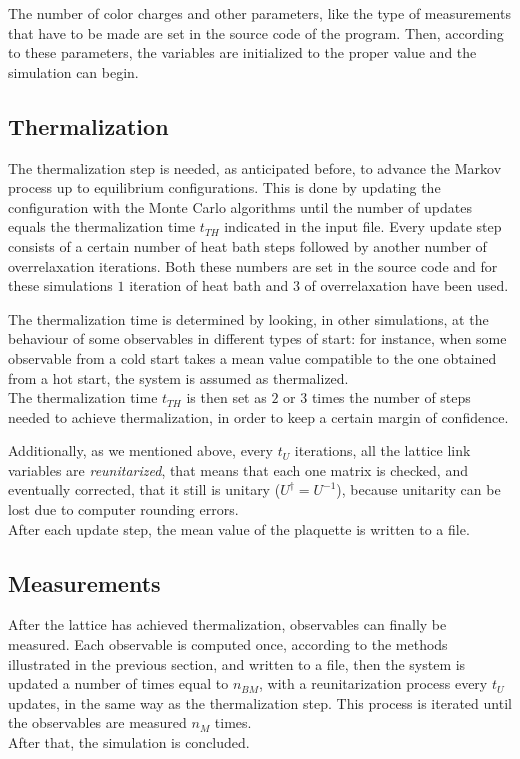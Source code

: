 The number of color charges and other parameters, like the type of measurements that have to be made are set in the source code of the program.
Then, according to these parameters, the variables are initialized to the proper value and the simulation can begin.

\subsection{Thermalization}
The thermalization step is needed, as anticipated before, to advance the Markov process up to equilibrium configurations.
This is done by updating the configuration with the Monte Carlo algorithms until the number of updates equals the thermalization time $t_{TH}$ indicated in the input file.
Every update step consists of a certain number of heat bath steps followed by another number of overrelaxation iterations.
Both these numbers are set in the source code and for these simulations $1$ iteration of heat bath and $3$ of overrelaxation have been used.

The thermalization time is determined by looking, in other simulations, at the behaviour of some observables in different types of start: for instance, when some observable from a cold start takes a mean value compatible to the one obtained from a hot start, the system is assumed as thermalized.\\
The thermalization time $t_{TH}$ is then set as $2$ or $3$ times the number of steps needed to achieve thermalization, in order to keep a certain margin of confidence.

Additionally, as we mentioned above, every $t_U$ iterations, all the lattice link variables are \emph{reunitarized}, that means that each one matrix is checked, and eventually corrected, that it still is unitary (\ie $U^\dagger=U^{-1}$), because unitarity can be lost due to computer rounding errors.\\
After each update step, the mean value of the plaquette is written to a file.

\subsection{Measurements}
After the lattice has achieved thermalization, observables can finally be measured.
Each observable is computed once, according to the methods illustrated in the previous section, and written to a file, then the system is updated a number of times equal to $n_{BM}$, with a reunitarization process every $t_U$ updates, in the same way as the thermalization step.
This process is iterated until the observables are measured $n_M$ times.\\
After that, the simulation is concluded.

